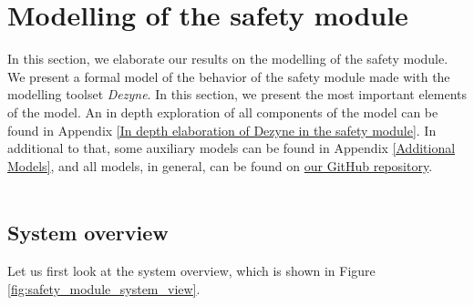 \documentclass[12pt]{scrreprt}
\begin{document}
\newpage
\section{Modelling of the safety module}
\label{Formal model of the behavior of the system}
In this section, we elaborate our results on the modelling of the safety module. We present a formal model of the behavior of the safety module made with the modelling toolset \textit{Dezyne}. In this section, we present the most important elements of the model. An in depth exploration of all components of the model can be found in Appendix \ref{In depth elaboration of Dezyne in the safety module}. In additional to that, some auxiliary models can be found in Appendix \ref{Additional Models}, and all models, in general, can be found on \href{https://github.com/Yousousen/safety-module-for-care-robot-rose.git}{our GitHub repository}.
\\\\



\subsection{System overview}
\label{System overview}
Let us first look at the system overview, which is shown in Figure \ref{fig:safety_module_system_view}.
\end{document}
